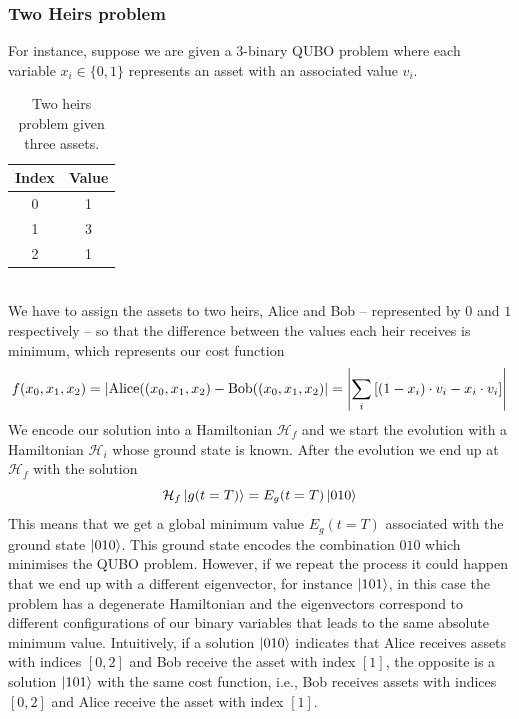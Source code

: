 \subsubsection{Two Heirs problem}
For instance, suppose we are given a 3-binary QUBO problem where each variable $x_{i} \in \{0,1\}$ represents an asset with an associated value $v_{i}$.
\begin{table}[h]
\label{tab:Assets}
\centering
\begin{tabular}{ c | c }
  \hline			
  Index & Value  \\
    \hline		
   0 & 1\\
       \hline		
   1 & 3\\
       \hline		
   2 & 1
\end{tabular}
\caption{Two heirs problem given three assets.}
\end{table}
\\
We have to assign the assets to two heirs, Alice and Bob -- represented by $0$ and $1$ respectively -- so that the difference between the values each heir receives is minimum, which represents our cost function
\begin{equation}
    f(x_{0}, x_{1}, x_{2}) = \abs{\text{Alice}((x_{0}, x_{1}, x_{2}) - \text{Bob}((x_{0}, x_{1}, x_{2})} = \abs{\sum_{i}\left[(1-x_{i})\cdot v_{i} - x_{i}\cdot v_{i}\right]}
\end{equation}
We encode our solution into a Hamiltonian $\mathcal{H}_{f}$ and we start the evolution with a Hamiltonian $\mathcal{H}_{i}$ whose ground state is known. After the evolution we end up at $\mathcal{H}_{f}$ with the solution
\begin{equation}
    \mathcal{H}_{f}\ket{g(t=T)} = E_{g}(t=T)\ket{010}
\end{equation}
This means that we get a global minimum value $E_{g}(t=T)$ associated with the ground state $\ket{010}$. This ground state encodes the combination $010$ which minimises the QUBO problem. However, if we repeat the process it could happen that we end up with a different eigenvector, for instance $\ket{101}$, in this case the problem has a degenerate Hamiltonian and the eigenvectors correspond to different configurations of our binary variables that leads to the same absolute minimum value. Intuitively, if a solution $\ket{010}$ indicates that Alice receives assets with indices $[0,2]$ and Bob receive the asset with index $[1]$, the opposite is a solution $\ket{101}$ with the same cost function, i.e., Bob receives assets with indices $[0,2]$ and Alice receive the asset with index $[1]$.

